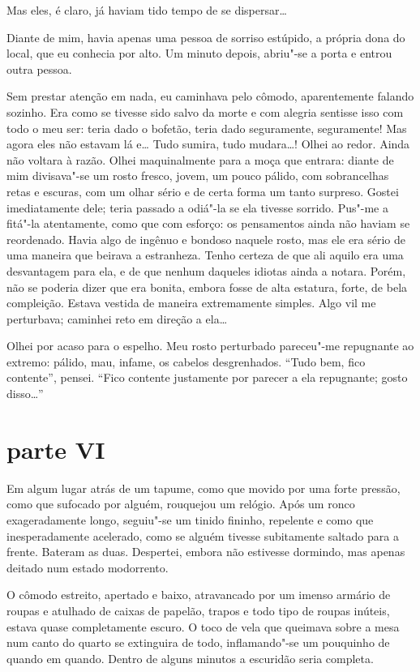 Mas eles, é claro, já haviam tido tempo de se dispersar\ldots{}

Diante de mim, havia apenas uma pessoa de sorriso estúpido, a própria
dona do local, que eu conhecia por alto. Um minuto depois, abriu"-se a
porta e entrou outra pessoa.

Sem prestar atenção em nada, eu caminhava pelo cômodo, aparentemente
falando sozinho. Era como se tivesse sido salvo da morte e com alegria
sentisse isso com todo o meu ser: teria dado o bofetão, teria dado
seguramente, seguramente! Mas agora eles não estavam lá e\ldots{} Tudo
sumira, tudo mudara\ldots{}! Olhei ao redor. Ainda não voltara à razão.
Olhei maquinalmente para a moça que entrara: diante de mim divisava"-se
um rosto fresco, jovem, um pouco pálido, com sobrancelhas retas e
escuras, com um olhar sério e de certa forma um tanto surpreso. Gostei
imediatamente dele; teria passado a odiá"-la se ela tivesse sorrido.
Pus"-me a fitá"-la atentamente, como que com esforço: os pensamentos
ainda não haviam se reordenado. Havia algo de ingênuo e bondoso naquele
rosto, mas ele era sério de uma maneira que beirava a estranheza. Tenho
certeza de que ali aquilo era uma desvantagem para ela, e de que nenhum
daqueles idiotas ainda a notara. Porém, não se poderia dizer que era
bonita, embora fosse de alta estatura, forte, de bela compleição.
Estava vestida de maneira extremamente simples. Algo vil me perturbava;
caminhei reto em direção a ela\ldots{}

Olhei por acaso para o espelho. Meu rosto perturbado pareceu"-me
repugnante ao extremo: pálido, mau, infame, os cabelos desgrenhados.
``Tudo bem, fico contente'', pensei. ``Fico contente justamente por
parecer a ela repugnante; gosto disso\ldots{}''


\section{parte VI}

Em algum lugar atrás de um tapume, como que movido por uma forte
pressão, como que sufocado por alguém, rouquejou um relógio. Após um
ronco exageradamente longo, seguiu"-se um tinido fininho, repelente e
como que inesperadamente acelerado, como se alguém tivesse subitamente
saltado para a frente. Bateram as duas. Despertei, embora não estivesse
dormindo, mas apenas deitado num estado modorrento.

O cômodo estreito, apertado e baixo, atravancado por um imenso armário
de roupas e atulhado de caixas de papelão, trapos e todo tipo de roupas
inúteis, estava quase completamente escuro. O toco de vela que queimava
sobre a mesa num canto do quarto se extinguira de todo, inflamando"-se
um pouquinho de quando em quando. Dentro de alguns minutos a escuridão
seria completa.

